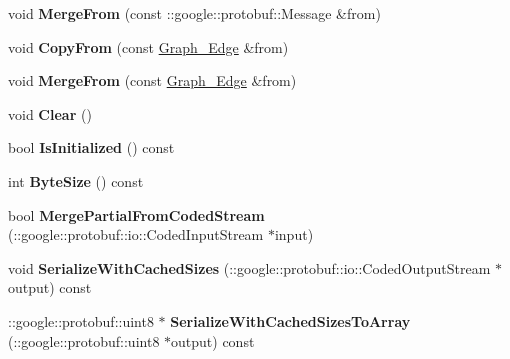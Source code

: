 \begin{DoxyCompactItemize}
\item 
\hypertarget{classgraph_1_1Graph__Edge_a21df881962677b6db77cd0fc6fdb8086}{
void {\bfseries MergeFrom} (const ::google::protobuf::Message \&from)}
\label{classgraph_1_1Graph__Edge_a21df881962677b6db77cd0fc6fdb8086}

\item 
\hypertarget{classgraph_1_1Graph__Edge_a70c9bb7cbaad6263cf5b67a61315daaf}{
void {\bfseries CopyFrom} (const \hyperlink{classgraph_1_1Graph__Edge}{Graph\_\-Edge} \&from)}
\label{classgraph_1_1Graph__Edge_a70c9bb7cbaad6263cf5b67a61315daaf}

\item 
\hypertarget{classgraph_1_1Graph__Edge_a9c6886542c53a31f42ae5ea9afa826c2}{
void {\bfseries MergeFrom} (const \hyperlink{classgraph_1_1Graph__Edge}{Graph\_\-Edge} \&from)}
\label{classgraph_1_1Graph__Edge_a9c6886542c53a31f42ae5ea9afa826c2}

\item 
\hypertarget{classgraph_1_1Graph__Edge_a2bbcc59dbf4e00c8f3007fa89b5470a9}{
void {\bfseries Clear} ()}
\label{classgraph_1_1Graph__Edge_a2bbcc59dbf4e00c8f3007fa89b5470a9}

\item 
\hypertarget{classgraph_1_1Graph__Edge_a9d94dfbfe951e8e834ccf837901c51dd}{
bool {\bfseries IsInitialized} () const }
\label{classgraph_1_1Graph__Edge_a9d94dfbfe951e8e834ccf837901c51dd}

\item 
\hypertarget{classgraph_1_1Graph__Edge_a76a24bfd2a4d0f0f79df2014bb4d184d}{
int {\bfseries ByteSize} () const }
\label{classgraph_1_1Graph__Edge_a76a24bfd2a4d0f0f79df2014bb4d184d}

\item 
\hypertarget{classgraph_1_1Graph__Edge_aed892b9333d734dde9a338fafa4ea497}{
bool {\bfseries MergePartialFromCodedStream} (::google::protobuf::io::CodedInputStream $\ast$input)}
\label{classgraph_1_1Graph__Edge_aed892b9333d734dde9a338fafa4ea497}

\item 
\hypertarget{classgraph_1_1Graph__Edge_a0f0582860901bfb055dda63c7193e7e3}{
void {\bfseries SerializeWithCachedSizes} (::google::protobuf::io::CodedOutputStream $\ast$output) const }
\label{classgraph_1_1Graph__Edge_a0f0582860901bfb055dda63c7193e7e3}

\item 
\hypertarget{classgraph_1_1Graph__Edge_ac4f89968c18ff0151c7536e843d5760a}{
::google::protobuf::uint8 $\ast$ {\bfseries SerializeWithCachedSizesToArray} (::google::protobuf::uint8 $\ast$output) const }
\label{classgraph_1_1Graph__Edge_ac4f89968c18ff0151c7536e843d5760a}


\end{DoxyCompactItemize}
